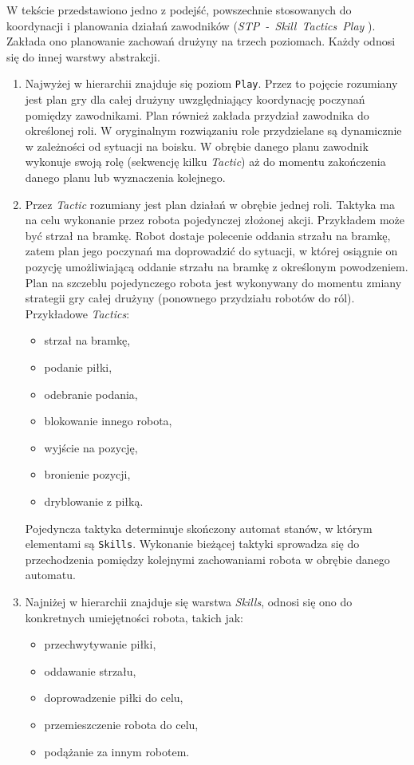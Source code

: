 W tekście przedstawiono jedno z podejść, powszechnie stosowanych do koordynacji i planowania działań zawodników (\mbox{\textit{STP - Skill Tactics Play}} \cite{stp}).
Zakłada ono planowanie zachowań drużyny na trzech poziomach. Każdy odnosi się do innej warstwy abstrakcji.
\begin{enumerate} 
  \item Najwyżej w hierarchii znajduje się poziom \texttt{Play}. Przez to pojęcie rozumiany jest plan gry dla całej drużyny uwzględniający koordynację
  poczynań pomiędzy zawodnikami. Plan również zakłada przydział zawodnika do określonej roli. W oryginalnym rozwiązaniu role przydzielane są dynamicznie w zależności od sytuacji na boisku.
  W obrębie danego planu zawodnik wykonuje swoją rolę (sekwencję kilku \textit{Tactic}) aż do momentu zakończenia danego planu lub wyznaczenia kolejnego.
  
  \item Przez \textit{Tactic} rozumiany jest plan działań w obrębie jednej roli. Taktyka ma na celu wykonanie przez robota pojedynczej złożonej akcji.
  Przykładem może być strzał na bramkę. Robot dostaje polecenie oddania strzału na bramkę, zatem plan jego poczynań ma doprowadzić
 do sytuacji, w której osiągnie on pozycję umożliwiającą oddanie strzału na bramkę z określonym powodzeniem.
 Plan na szczeblu pojedynczego robota jest wykonywany do momentu zmiany strategii gry całej drużyny (ponownego przydziału robotów do ról).
 Przykładowe \textit{Tactics}:
 \begin{itemize}
  \item strzał na bramkę,
  \item podanie piłki,
  \item odebranie podania,
  \item blokowanie innego robota,
  \item wyjście na pozycję,
  \item bronienie pozycji,
  \item dryblowanie z piłką.
 \end{itemize}

  Pojedyncza taktyka determinuje skończony automat stanów, w którym elementami są \texttt{Skills}. Wykonanie bieżącej taktyki sprowadza się do przechodzenia pomiędzy kolejnymi zachowaniami robota w obrębie
  danego automatu.
\newpage
  \item Najniżej w hierarchii znajduje się warstwa \textit{Skills}, odnosi się ono do konkretnych umiejętności robota, takich jak:
    \begin{itemize}
    \item przechwytywanie piłki,
    \item oddawanie strzału,
    \item doprowadzenie piłki do celu,
    \item przemieszczenie robota do celu,
    \item podążanie za innym robotem.
    \end{itemize}


\end{enumerate}
